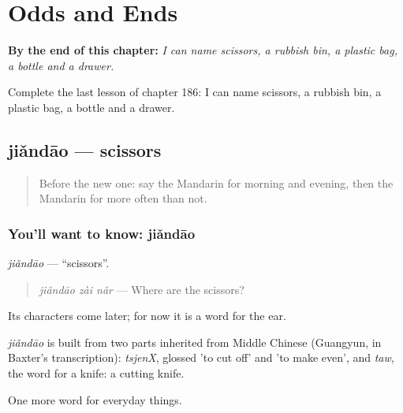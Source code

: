 
\chapter{Odds and Ends}
\label{ch:zh-odds-and-ends}

\begin{chapteropening}
\textbf{By the end of this chapter:} \emph{I can name scissors, a rubbish bin, a plastic bag, a bottle and a drawer.}

Complete the last lesson of chapter 186: I can name scissors, a rubbish bin, a plastic bag, a bottle and a drawer.
\end{chapteropening}

\section[jiǎndāo]{jiǎndāo — scissors}

\label{lesson:ZH-C186-jiandao}



\begin{quote}
Before the new one: say the Mandarin for morning and evening, then the Mandarin for more often than not.
\end{quote}

\subsection*{You'll want to know: jiǎndāo}
\emph{jiǎndāo} — \textquotedblleft{}scissors\textquotedblright{}.

\begin{quote}
\emph{jiǎndāo zài nǎr} — Where are the scissors?
\end{quote}

Its characters come later; for now it is a word for the ear.

\begin{cousinweb}
\emph{jiǎndāo} is built from two parts inherited from Middle Chinese (Guangyun, in Baxter's transcription): \emph{tsjenX}, glossed 'to cut off' and 'to make even', and \emph{taw}, the word for a knife: a cutting knife.
\end{cousinweb}

\begin{grammarlens}[title={What you've built}]
One more word for everyday things.
\end{grammarlens}

